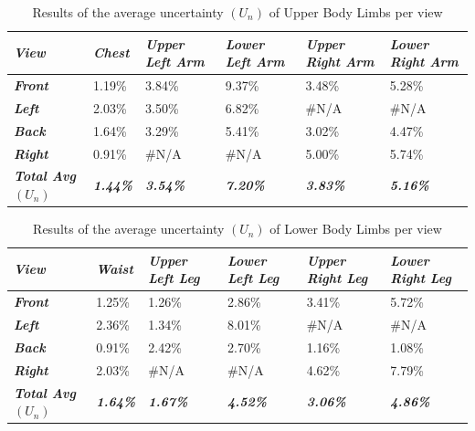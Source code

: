 \begin{table}[htbp]
	\centering
	\caption{Results of the average uncertainty $(U_n)$ of Upper Body Limbs per view}
	\begin{tabularx}{\textwidth}{|Y|Y|Y|Y|Y|Y|}
		\toprule
		\textit{\textbf{View}} & \textit{\textbf{Chest}} & \textit{\textbf{Upper Left Arm}} & \textit{\textbf{Lower Left Arm}} & \textit{\textbf{Upper Right Arm}} & \textit{\textbf{Lower Right Arm}} \\
		\midrule
		\textit{\textbf{Front}} & 1.19\% & 3.84\% & 9.37\% & 3.48\% & 5.28\% \\
		\midrule
		\textit{\textbf{Left}} & 2.03\% & 3.50\% & 6.82\% & \#N/A & \#N/A \\
		\midrule
		\textit{\textbf{Back}} & 1.64\% & 3.29\% & 5.41\% & 3.02\% & 4.47\% \\
		\midrule
		\textit{\textbf{Right}} & 0.91\% & \#N/A & \#N/A & 5.00\% & 5.74\% \\
		\midrule
		\textit{\textbf{Total Avg $(U_n)$}} & \textit{\textbf{1.44\%}} & \textit{\textbf{3.54\%}} & \textit{\textbf{7.20\%}} & \textit{\textbf{3.83\%}} & \textit{\textbf{5.16\%}} \\
		\bottomrule
	\end{tabularx}%
	\label{tab:upperBodyUncertainty}%
\end{table}%

\begin{table}[htbp]
	\centering
	\caption{Results of the average uncertainty $(U_n)$ of Lower Body Limbs per view}
	\begin{tabularx}{\textwidth}{|Y|Y|Y|Y|Y|Y|}
		\toprule
		\textit{\textbf{View}} & \textit{\textbf{Waist}} & \textit{\textbf{Upper Left Leg}} & \textit{\textbf{Lower Left Leg}} & \textit{\textbf{Upper Right Leg}} & \textit{\textbf{Lower Right Leg}} \\
		\midrule
		\textit{\textbf{Front}} & 1.25\% & 1.26\% & 2.86\% & 3.41\% & 5.72\% \\
		\midrule
		\textit{\textbf{Left}} & 2.36\% & 1.34\% & 8.01\% & \#N/A & \#N/A \\
		\midrule
		\textit{\textbf{Back}} & 0.91\% & 2.42\% & 2.70\% & 1.16\% & 1.08\% \\
		\midrule
		\textit{\textbf{Right}} & 2.03\% & \#N/A & \#N/A & 4.62\% & 7.79\% \\
		\midrule
		\textit{\textbf{Total Avg $(U_n)$}} & \textit{\textbf{1.64\%}} & \textit{\textbf{1.67\%}} & \textit{\textbf{4.52\%}} & \textit{\textbf{3.06\%}} & \textit{\textbf{4.86\%}} \\
		\bottomrule
	\end{tabularx}%
	\label{tab:lowerBodyUncertainty}%
\end{table}%


